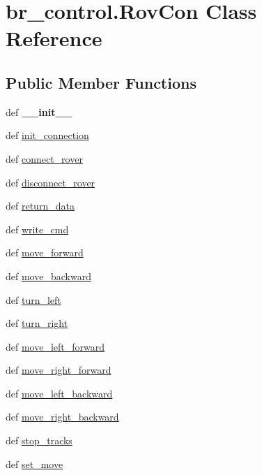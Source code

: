 \hypertarget{classbr__control_1_1RovCon}{\section{br\-\_\-control.\-Rov\-Con Class Reference}
\label{classbr__control_1_1RovCon}
}
\subsection*{Public Member Functions}
\begin{DoxyCompactItemize}
\item 
\hypertarget{classbr__control_1_1RovCon_a7533ab62ea4cc893c6746255c4461fc1}{def {\bfseries \-\_\-\-\_\-init\-\_\-\-\_\-}}\label{classbr__control_1_1RovCon_a7533ab62ea4cc893c6746255c4461fc1}

\item 
def \hyperlink{classbr__control_1_1RovCon_ae78629cccbf439e7f3a421af6d71e688}{init\-\_\-connection}
\item 
def \hyperlink{classbr__control_1_1RovCon_a31d708a3600be1ddf262be25ecdb90ff}{connect\-\_\-rover}
\item 
def \hyperlink{classbr__control_1_1RovCon_ab0d8ceb5c98e8abc6ab6dd5b9056cce0}{disconnect\-\_\-rover}
\item 
def \hyperlink{classbr__control_1_1RovCon_ae6b0a3e05a64448b8aea070e1a1a4fe2}{return\-\_\-data}
\item 
def \hyperlink{classbr__control_1_1RovCon_ad523897a82e2c5d291a03316e1b95085}{write\-\_\-cmd}
\item 
def \hyperlink{classbr__control_1_1RovCon_aae1ed0de2049e0b06b022043de0b3a14}{move\-\_\-forward}
\item 
def \hyperlink{classbr__control_1_1RovCon_aeb614f112b022759fa9a697bd9af0483}{move\-\_\-backward}
\item 
def \hyperlink{classbr__control_1_1RovCon_a4df7890a3f918b661681d7d5118b7686}{turn\-\_\-left}
\item 
def \hyperlink{classbr__control_1_1RovCon_a137365dfeacdea3e2c958097aeca14f2}{turn\-\_\-right}
\item 
def \hyperlink{classbr__control_1_1RovCon_ad07e604de665d4d36e590f8bf9fb88de}{move\-\_\-left\-\_\-forward}
\item 
def \hyperlink{classbr__control_1_1RovCon_a67c020ad7297269be2bcaf684c6e0472}{move\-\_\-right\-\_\-forward}
\item 
def \hyperlink{classbr__control_1_1RovCon_a3ae783fe12e00ab50c25e7d683f3c330}{move\-\_\-left\-\_\-backward}
\item 
def \hyperlink{classbr__control_1_1RovCon_aa6ddfb57baaa2ced42bdaf42d621745b}{move\-\_\-right\-\_\-backward}
\item 
def \hyperlink{classbr__control_1_1RovCon_a2894a3706f179884fa32ea99d4a4292a}{stop\-\_\-tracks}
\item 
def \hyperlink{classbr__control_1_1RovCon_a53e63eb0a98df67e894da34ac1d841b2}{set\-\_\-move}
\end{DoxyCompactItemize}
